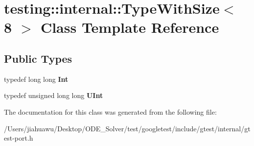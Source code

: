 \hypertarget{classtesting_1_1internal_1_1_type_with_size_3_018_01_4}{}\section{testing\+:\+:internal\+:\+:Type\+With\+Size$<$ 8 $>$ Class Template Reference}
\label{classtesting_1_1internal_1_1_type_with_size_3_018_01_4}
\subsection*{Public Types}
\begin{DoxyCompactItemize}
\item 
\mbox{\label{classtesting_1_1internal_1_1_type_with_size_3_018_01_4_a36d5697e5f5254b0495f13c97d747e36}} 
typedef long long {\bfseries Int}
\item 
\mbox{\label{classtesting_1_1internal_1_1_type_with_size_3_018_01_4_a747e21c5aee8faf07ec65cd4c3d1ca62}} 
typedef unsigned long long {\bfseries U\+Int}
\end{DoxyCompactItemize}


The documentation for this class was generated from the following file\+:\begin{DoxyCompactItemize}
\item 
/\+Users/jiahuawu/\+Desktop/\+O\+D\+E\+\_\+\+Solver/test/googletest/include/gtest/internal/gtest-\/port.\+h\end{DoxyCompactItemize}
